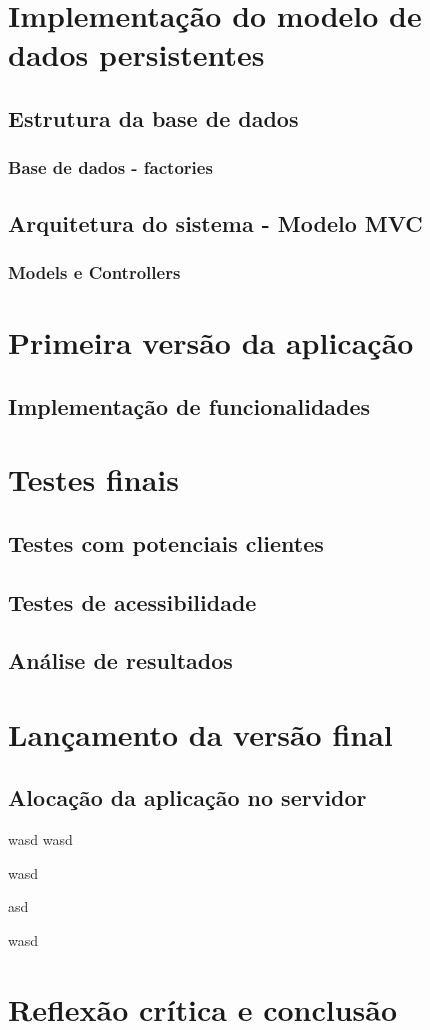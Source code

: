 \documentclass[11pt, twoside]{report}
\begin{document}
	\chapter{Implementação do modelo de dados persistentes}
	\section{Estrutura da base de dados}
	\subsection{Base de dados - factories}
	\section{Arquitetura do sistema - Modelo MVC}
	\subsection{Models e Controllers}
	
	\chapter{Primeira versão da aplicação}
	\section{Implementação de funcionalidades}
	
	\chapter{Testes finais}
	\section{Testes com potenciais clientes}
	\section{Testes de acessibilidade}
	\section{Análise de resultados}
	
	\chapter{Lançamento da versão final}
	\section{Alocação da aplicação no servidor}
	
	\pagebreak
	wasd
	wasd
	
	
	wasd
	
	
	\pagebreak
	
	asd
	
	wasd
	\chapter{Reflexão crítica e conclusão}
	
	

	
	
	
\end{document}
